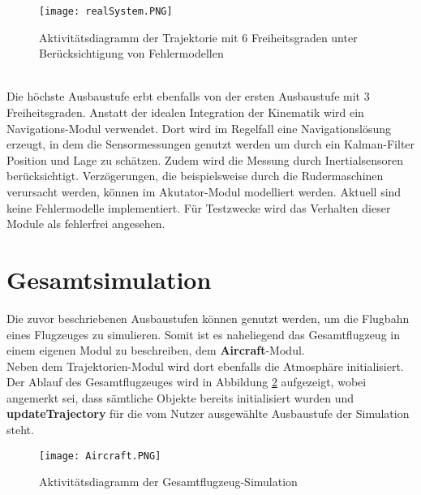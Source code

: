 \begin{figure}[h]
	\texttt{[image: realSystem.PNG]}
	\caption{Aktivitätsdiagramm der Trajektorie mit 6 Freiheitsgraden unter Berücksichtigung von Fehlermodellen}
	\label{fig:realSys}
\end{figure}\\
Die höchste Ausbaustufe erbt ebenfalls von der ersten Ausbaustufe mit 3 Freiheitsgraden. Anstatt der idealen Integration der Kinematik wird ein Navigations-Modul verwendet. Dort wird im Regelfall eine Navigationslösung erzeugt, in dem die Sensormessungen genutzt werden um durch ein Kalman-Filter Position und Lage zu schätzen. Zudem wird die Messung durch Inertialsensoren berücksichtigt. Verzögerungen, die beispielsweise durch die Rudermaschinen verursacht werden, können im Akutator-Modul modelliert werden. Aktuell sind keine Fehlermodelle implementiert. Für Testzwecke wird das Verhalten dieser Module als fehlerfrei angesehen.

\section{Gesamtsimulation}
Die zuvor beschriebenen Ausbaustufen können genutzt werden, um die Flugbahn eines Flugzeuges zu simulieren. Somit ist es naheliegend das Gesamtflugzeug in einem eigenen Modul zu beschreiben, dem \textbf{Aircraft}-Modul.\\
Neben dem Trajektorien-Modul wird dort ebenfalls die Atmosphäre initialisiert. Der Ablauf des Gesamtflugzeuges wird in Abbildung \ref{fig:Aircraft} aufgezeigt, wobei angemerkt sei, dass sämtliche Objekte bereits initialisiert wurden und \textbf{updateTrajectory} für die vom Nutzer ausgewählte Ausbaustufe der Simulation steht.
\begin{figure}[h]
	\centering\texttt{[image: Aircraft.PNG]}
	\caption{Aktivitätsdiagramm der Gesamtflugzeug-Simulation}
	\label{fig:Aircraft}
\end{figure}\\
